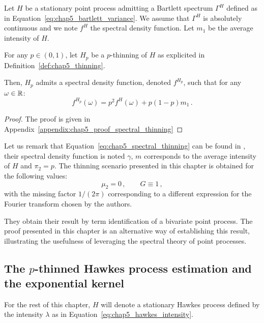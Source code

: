 \begin{proposition}\label{prop:chap5_spectral_thinning}
    Let $H$ be a stationary point process admitting a Bartlett spectrum $\Gamma^H$ defined as in Equation~\eqref{eq:chap5_bartlett_variance}.
    We assume that $\Gamma^H$ is absolutely continuous and we note $f^H$ the spectral density function. 
    Let $m_1$ be the average intensity of $H$.

    For any $p\in(0,1)$, let $H_p$ be a $p$-thinning of $H$ as explicited in Definition~\ref{def:chap5_thinning}.

    Then, $H_p$ admits a spectral density function, denoted $f^{H_p}$, such that for any $\omega\in{\mathbb R}$:
    \begin{equation}\label{eq:chap5_spectral_thinning}
        f^{H_p}(\omega) = p^2 f^H(\omega) + p(1-p)m_1\,.
    \end{equation}

\end{proposition}

\begin{proof}
    The proof is given in Appendix~\ref{appendix:chap5_proof_spectral_thinning}
\end{proof}

    Let us remark that Equation~\eqref{eq:chap5_spectral_thinning} can be found in \textcite[Equation 8.3.5]{DaleyV1},
    their spectral density function is noted $\gamma$, $m$ corresponds to the average intensity of $H$ and $\pi_2 = p$.
    The thinning scenario presented in this chapter is obtained for the following values:
    \[\mu_2 = 0\,, \qquad G\equiv 1\,,\]
    with the missing factor $1/(2\pi)$ corresponding to a different expression for the Fourier transform chosen by the authors.

    They obtain their result by term identification of a bivariate point process. 
    The proof presented in this chapter is an alternative way of establishing this result,
    illustrating the usefulness of leveraging the spectral theory of point processes.


    \subsection{The $p$-thinned Hawkes process estimation and the exponential kernel}\label{sec:chap5_thinned_hawkes}

    For the rest of this chapter, 
    $H$ will denote a stationary Hawkes process defined by the intensity $\lambda$ as in Equation~\eqref{eq:chap5_hawkes_intensity}.

